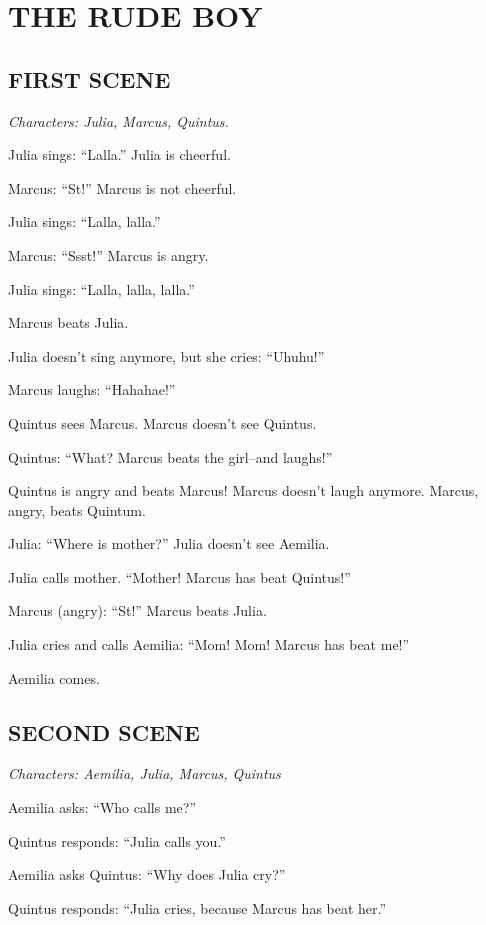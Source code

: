 
\chapter{THE RUDE BOY}

\linenumbers[1]

\section[First scene]{FIRST SCENE}
\emph{Characters: Julia, Marcus, Quintus.}

Julia sings: ``Lalla.'' Julia is cheerful.

Marcus: ``St!'' Marcus is not cheerful.

Julia sings: ``Lalla, lalla.''

Marcus: ``Ssst!'' Marcus is angry.

Julia sings: ``Lalla, lalla, lalla.''

Marcus beats Julia.

Julia doesn't sing anymore, but she cries: ``Uhuhu!''

Marcus laughs: ``Hahahae!''

Quintus sees Marcus. Marcus doesn't see Quintus.

Quintus: ``What? Marcus beats the girl--and laughs!''

Quintus is angry and beats Marcus! Marcus doesn't laugh anymore. Marcus, angry, beats Quintum.

Julia: ``Where is mother?'' Julia doesn't see Aemilia.

Julia calls mother. ``Mother! Marcus has beat Quintus!''

Marcus (angry): ``St!'' Marcus beats Julia.

Julia cries and calls Aemilia: ``Mom! Mom! Marcus has beat me!''

Aemilia comes.

\section[Second scene]{SECOND SCENE}
\emph{Characters: Aemilia, Julia, Marcus, Quintus}

Aemilia asks: ``Who calls me?''

Quintus responds: ``Julia calls you.''

Aemilia asks Quintus: ``Why does Julia cry?''

Quintus responds: ``Julia cries, because Marcus has beat her.''

